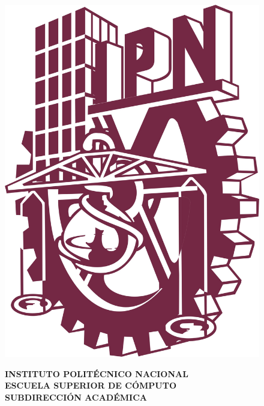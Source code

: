 \documentclass[12pt]{report}
\begin{document}
\newpage

\begin{figure}[H]
	\begin{minipage}[p]{0.13\linewidth}
		\centering
		\includegraphics[width=\linewidth]{images/logoIPN}
	\end{minipage}
	\hspace{.85cm}
\begin{minipage}[p] {0.55\linewidth}
	\begin{center}
		\begin{large}
			\textbf {INSTITUTO POLITÉCNICO NACIONAL}\\
			\textbf {ESCUELA SUPERIOR DE CÓMPUTO}\\
			\textbf {SUBDIRECCIÓN ACADÉMICA}\\
		\end{large}
	\end{center}
\end{minipage}

\end{figure}
\end{document}
